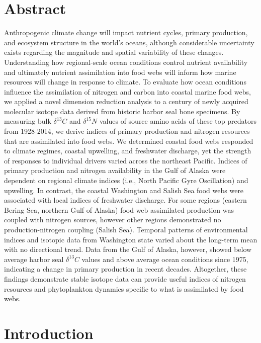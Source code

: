 \documentclass [11pt, proquest] {uwthesis}[2015/03/03]
\begin{document}
\section{Abstract}\label{abstract-1}

Anthropogenic climate change will impact nutrient cycles, primary
production, and ecosystem structure in the world's oceans, although
considerable uncertainty exists regarding the magnitude and spatial
variability of these changes. Understanding how regional-scale ocean
conditions control nutrient availability and ultimately nutrient
assimilation into food webs will inform how marine resources will change
in response to climate. To evaluate how ocean conditions influence the
assimilation of nitrogen and carbon into coastal marine food webs, we
applied a novel dimension reduction analysis to a century of newly
acquired molecular isotope data derived from historic harbor seal bone
specimens. By measuring bulk \(\delta^{13}C\) and \(\delta^{15}N\)
values of source amino acids of these top predators from 1928-2014, we
derive indices of primary production and nitrogen resources that are
assimilated into food webs. We determined coastal food webs responded to
climate regimes, coastal upwelling, and freshwater discharge, yet the
strength of responses to individual drivers varied across the northeast
Pacific. Indices of primary production and nitrogen availability in the
Gulf of Alaska were dependent on regional climate indices (i.e., North
Pacific Gyre Oscillation) and upwelling. In contrast, the coastal
Washington and Salish Sea food webs were associated with local indices
of freshwater discharge. For some regions (eastern Bering Sea, northern
Gulf of Alaska) food web assimilated production was coupled with
nitrogen sources, however other regions demonstrated no
production-nitrogen coupling (Salish Sea). Temporal patterns of
environmental indices and isotopic data from Washington state varied
about the long-term mean with no directional trend. Data from the Gulf
of Alaska, however, showed below average harbor seal \(\delta^{13}C\)
values and above average ocean conditions since 1975, indicating a
change in primary production in recent decades. Altogether, these
findings demonstrate stable isotope data can provide useful indices of
nitrogen resources and phytoplankton dynamics specific to what is
assimilated by food webs.

\section{Introduction}\label{introduction-2}
\end{document}
